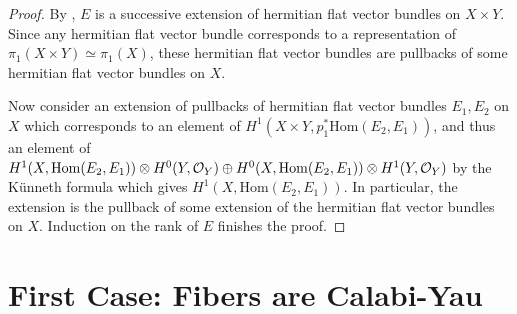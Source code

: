 \documentclass[a4, 12pt]{amsart}
\numberwithin{equation}{section}
\theoremstyle{definition}
\def \hom{\mathrm{Hom}}
\begin{document}
\begin{proof}
By \cite[Theorem 1.18]{DPS94}, $E$ is a successive extension of hermitian flat vector bundles on $X \times Y$.
Since any hermitian flat vector bundle corresponds to a representation of $\pi_1(X \times Y) \simeq \pi_1(X)$,
these hermitian flat vector bundles are pullbacks of some hermitian flat vector bundles on $X$.

Now consider an extension of pullbacks of hermitian flat vector bundles $E_1, E_2$ on $X$
which corresponds to an element of
$H^1(X \times Y, p_1^* \hom(E_2, E_1))$, and thus an element of $H^1(X, \hom(E_2, E_1)) \otimes H^0(Y, \cO_Y) \oplus H^0(X,  \hom(E_2, E_1)) \otimes H^1(Y, \cO_Y)$  by the K\"unneth formula which gives $H^1(X, \hom(E_2, E_1))$.
In particular, the extension is the pullback of some extension of the hermitian flat vector bundles on $X$.
Induction on the rank of $E$ finishes the proof. 
\end{proof}

\section{First Case: Fibers are Calabi-Yau}
\end{document}
